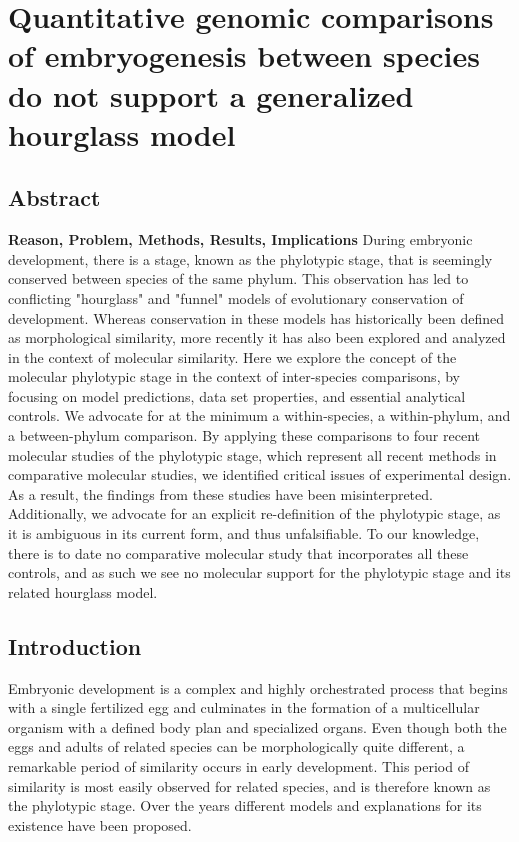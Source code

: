 \chapter{Quantitative genomic comparisons of embryogenesis between species do not support a generalized hourglass model}\thumbforchapter
{}
\newpage

\section{Abstract}

\textbf{Reason, Problem, Methods, Results, Implications}
During embryonic development, there is a stage, known as the phylotypic stage, that is seemingly conserved between species of the same phylum. This observation has led to conflicting "hourglass" and "funnel" models of evolutionary conservation of development. Whereas conservation in these models has historically been defined as morphological similarity, more recently it has also been explored and analyzed in the context of molecular similarity. 
Here we explore the concept of the molecular phylotypic stage in the context of inter-species comparisons, by focusing on model predictions, data set properties, and essential analytical controls. We advocate for at the minimum a within-species, a within-phylum, and a between-phylum comparison. 
By applying these comparisons to four recent molecular studies of the phylotypic stage, which represent all recent methods in comparative molecular studies, we identified critical issues of experimental design. As a result, the findings from these studies have been misinterpreted. Additionally, we advocate for an explicit re-definition of the phylotypic stage, as it is ambiguous in its current form, and thus unfalsifiable. To our knowledge, there is to date no comparative molecular study that incorporates all these controls, and as such we see no molecular support for the phylotypic stage and its related hourglass model.

\section{Introduction}

Embryonic development is a complex and highly orchestrated process that begins with a single fertilized egg and culminates in the formation of a multicellular organism with a defined body plan and specialized organs. Even though both the eggs and adults of related species can be morphologically quite different, a remarkable period of similarity occurs in early development. This period of similarity is most easily observed for related species, and is therefore known as the phylotypic stage. Over the years different models and explanations for its existence have been proposed\cite{Kalinka2012,Irie2014,Drost2017}.  

